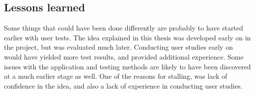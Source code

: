 \subsection{Lessons learned}

Some things that could have been done differently are probably to have started earlier with user tests. The idea explained in this thesis was developed early on in the project, but was evaluated much later. Conducting user studies early on would have yielded more test results, and provided additional experience. Some issues with the application and testing methods are likely to have been discovered at a much earlier stage as well. One of the reasons for stalling, was lack of confidence in the idea, and also a lack of experience in conducting user studies.





















